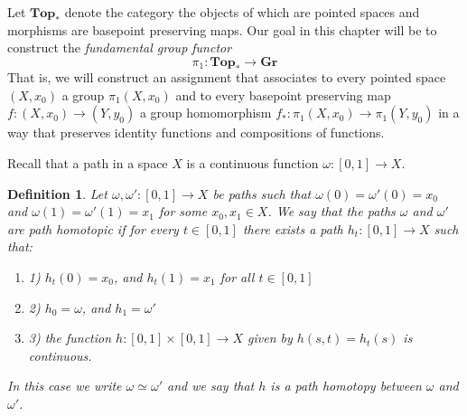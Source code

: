 \documentclass[11pt, letterpaper, oneside]{report}
\theoremstyle{pplain}
\theoremstyle{ddefinition}
\newtheorem{definition}[theorem]{Definition}
\theoremstyle{nnn}
\theoremstyle{eexercise}
\newcommand{\Gr}{{\mathbf{Gr}}}
\newcommand{\Top}{{\mathbf{Top}}}
\newcommand{\benu}{\begin{enumerate}}
\newcommand{\eenu}{\end{enumerate}}
\begin{document}
Let $\Top_{\ast}$ denote the category the objects of which are pointed spaces and morphisms 
are basepoint preserving maps. Our goal in this chapter will be to construct the 
\emph{fundamental group functor} 
$$\pi_{1}\colon \Top_{\ast} \to \Gr$$
That is, we will construct an assignment that associates to every pointed space $(X, x_{0})$
a group $\pi_{1}(X, x_{0})$ and to every basepoint preserving map $f\colon (X, x_{0}) \to (Y, y_{0})$ 
a group homomorphism $f_{\ast}\colon \pi_{1}(X, x_{0}) \to \pi_{1}(Y, y_{0})$ in a way that 
preserves  identity functions and compositions of functions.

Recall that a path in a space $X$ is a continuous function $\omega \colon [0, 1] \to X$. 

\begin{definition}
Let $\omega, \omega'\colon [0, 1]\to X$ be paths such that $\omega(0) = \omega'(0) = x_{0}$
and $\omega(1) = \omega'(1) = x_{1}$ for some $x_{0}, x_{1}\in X$. 
We say that the paths $\omega$ and $\omega'$ are 
\emph{path homotopic} if for every $t\in [0, 1]$ there exists a path 
$h_{t}\colon [0, 1] \to X$  such that:
\benu
\item[1)] $h_{t}(0) = x_{0}$, and $h_{t}(1) = x_{1}$ for all $t\in [0, 1]$
\item[2)] $h_{0} = \omega$,  and $h_{1} = \omega'$
\item[3)] the function $h\colon [0, 1]\times [0,1] \to X$ given by $h(s, t) = h_{t}(s)$
is continuous. 
\eenu
In this case we write $\omega \simeq \omega'$ and we say that $h$ is a
\emph{path homotopy} between $\omega$ and $\omega'$.  

\begin{tikzpicture}


\end{tikzpicture}
\end{definition}
\end{document}

